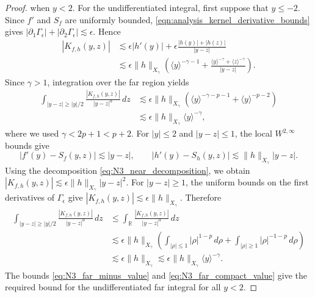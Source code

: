 \documentclass[11pt]{amsart}
\theoremstyle{definition}
\theoremstyle{remark}
\numberwithin{equation}{section}
\newcommand{\R}{\mathbb{R}}
\newcommand{\ang}[1]{\langle #1 \rangle}
\begin{document}
\begin{proof}
when $y < 2$.
For the undifferentiated integral, first suppose that $y\leq-2$.
Since $f'$ and $S_f$ are uniformly bounded, \eqref{eqn:analysis_kernel_derivative_bounds} gives
$|\partial_1\Gamma_\epsilon|+|\partial_2\Gamma_\epsilon|\lesssim\epsilon$. Hence
\begin{equation}\label{eq:N3_far_minus_integrand_bound}
\begin{aligned}
    |K_{f,h}(y,z)|
    &\lesssim\epsilon|h'(y)|
    +\epsilon\frac{|h(y)|+|h(z)|}{|y-z|}\\
    &\lesssim\epsilon\|h\|_{X_\gamma}\left(
    \ang{y}^{-\gamma-1}
    +\frac{\ang{y}^{-\gamma}+\ang{z}^{-\gamma}}{|y-z|}\right).
\end{aligned}
\end{equation}
Since $\gamma>1$, integration over the far region yields
\begin{equation}\label{eq:N3_far_minus_value}
\begin{aligned}
    \int_{|y-z|\geq |y|/2}\frac{|K_{f,h}(y,z)|}{|y-z|^\alpha}\,dz
    &\lesssim\epsilon\|h\|_{X_\gamma}\left(
    \ang{y}^{-\gamma-p-1}+\ang{y}^{-p-2}\right)\\
    &\lesssim\epsilon\|h\|_{X_\gamma}\ang{y}^{-\gamma},
\end{aligned}
\end{equation}
where we used $\gamma<2p+1<p+2$.
For $|y|\leq2$ and $|y-z|\leq1$, the local $W^{2,\infty}$ bounds give
\[
    |f'(y)-S_f(y,z)|\lesssim|y-z|,\qquad
    |h'(y)-S_h(y,z)|\lesssim\|h\|_{X_\gamma}|y-z|.
\]
Using the decomposition \eqref{eq:N3_near_decomposition}, we obtain
$|K_{f,h}(y,z)|\lesssim\epsilon\|h\|_{X_\gamma}|y-z|^2$.
For $|y-z|\geq1$, the uniform bounds on the first derivatives of $\Gamma_\epsilon$
give $|K_{f,h}(y,z)|\lesssim\epsilon\|h\|_{X_\gamma}$.
Therefore
\begin{equation}\label{eq:N3_far_compact_value}
\begin{aligned}
    \int_{|y-z|\geq |y|/2}\frac{|K_{f,h}(y,z)|}{|y-z|^\alpha}\,dz
    &\leq\int_{\R}\frac{|K_{f,h}(y,z)|}{|y-z|^\alpha}\,dz\\
    &\lesssim\epsilon\|h\|_{X_\gamma}\left(
    \int_{|\rho|\leq1}|\rho|^{1-p}\,d\rho
    +\int_{|\rho|\geq1}|\rho|^{-1-p}\,d\rho\right)\\
    &\lesssim\epsilon\|h\|_{X_\gamma}
    \lesssim\epsilon\|h\|_{X_\gamma}\ang{y}^{-\gamma}.
\end{aligned}
\end{equation}
The bounds \eqref{eq:N3_far_minus_value} and \eqref{eq:N3_far_compact_value} give the required bound for the undifferentiated far integral for all $y<2$.


\end{proof}
\end{document}
